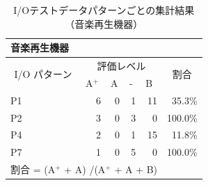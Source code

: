 


\begin{table}[htbp]
  \centering
   \caption{I/Oテストデータパターンごとの集計結果（音楽再生機器）}
    \begin{tabular}{lllllr}
     音楽再生機器 &       &       &       &       &  \bigstrut[b]\\
    \hline
    \multicolumn{1}{|c|}{\multirow{2}[4]{*}{I/O パターン}} & \multicolumn{4}{c|}{評価レベル}    & \multicolumn{1}{c|}{\multirow{2}[4]{*}{割合}} \bigstrut\\
\cline{2-5}    \multicolumn{1}{|c|}{} & \multicolumn{1}{l|}{A${}^\text{+}$ } & \multicolumn{1}{l|}{A} & \multicolumn{1}{l|}{-} & \multicolumn{1}{l|}{B} & \multicolumn{1}{c|}{} \bigstrut\\
    \hline
    \hline
    \multicolumn{1}{|l|}{P1} & \multicolumn{1}{r|}{6} & \multicolumn{1}{r|}{0} & \multicolumn{1}{r|}{1} & \multicolumn{1}{r|}{11} & \multicolumn{1}{r|}{35.3\%} \bigstrut\\
    \hline
    \multicolumn{1}{|l|}{P2} & \multicolumn{1}{r|}{3} & \multicolumn{1}{r|}{0} & \multicolumn{1}{r|}{3} & \multicolumn{1}{r|}{0} & \multicolumn{1}{r|}{100.0\%} \bigstrut\\
    \hline
    \multicolumn{1}{|l|}{P4} & \multicolumn{1}{r|}{2} & \multicolumn{1}{r|}{0} & \multicolumn{1}{r|}{1} & \multicolumn{1}{r|}{15} & \multicolumn{1}{r|}{11.8\%} \bigstrut\\
    \hline
    \multicolumn{1}{|l|}{P7} & \multicolumn{1}{r|}{1} & \multicolumn{1}{r|}{0} & \multicolumn{1}{r|}{5} & \multicolumn{1}{r|}{0} & \multicolumn{1}{r|}{100.0\%} \bigstrut\\
    \hline
    \multicolumn{5}{l}{割合 = (A${}^\text{+}$   +  A) /(A${}^\text{+}$   +  A + B) } &  \bigstrut[t]\\
    \end{tabular}%
 \label{tab:D-4-tab9}%
\end{table}%


